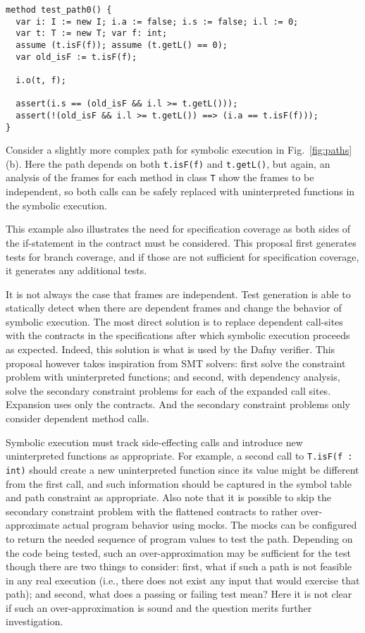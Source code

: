\documentclass[11pt,onecolumn,notitlepage]{article}
\newcommand{\figref}[1]{Fig.~\ref{#1}}
\begin{document}
\begin{lstlisting}
method test_path0() {
  var i: I := new I; i.a := false; i.s := false; i.l := 0;
  var t: T := new T; var f: int;
  assume (t.isF(f)); assume (t.getL() == 0);
  var old_isF := t.isF(f);
  
  i.o(t, f);
  
  assert(i.s == (old_isF && i.l >= t.getL()));
  assert(!(old_isF && i.l >= t.getL()) ==> (i.a == t.isF(f)));
}
\end{lstlisting}


Consider a slightly more complex path for symbolic execution in \figref{fig:paths}(b). Here the path depends on both \texttt{t.isF(f)} and \texttt{t.getL()}, but again, an analysis of the frames for each method in class \texttt{T} show the frames to be independent, so both calls can be safely replaced with uninterpreted functions in the symbolic execution.

This example also illustrates the need for specification coverage as both sides of the if-statement in the contract must be considered. This proposal first generates tests for branch coverage, and if those are not sufficient for specification coverage, it generates any additional tests. 

It is not always the case that frames are independent. Test generation is able to statically detect when there are dependent frames and change the behavior of symbolic execution. The most direct solution is to replace dependent call-sites with the contracts in the specifications after which symbolic execution proceeds as expected. Indeed, this solution is what is used by the Dafny verifier. This proposal however takes inspiration from SMT solvers: first solve the constraint problem with uninterpreted functions; and second, with dependency analysis, solve the secondary constraint problems for each of the expanded call sites. Expansion uses only the contracts. And the secondary constraint problems only consider dependent method calls.

Symbolic execution must track side-effecting calls and introduce new uninterpreted functions as appropriate. For example, a second call to \texttt{T.isF(f : int)} should create a new uninterpreted function since its value might be different from the first call, and such information should be captured in the symbol table and path constraint as appropriate. Also note that it is possible to skip the secondary constraint problem with the flattened contracts to rather over-approximate actual program behavior using mocks. The mocks can be configured to return the needed sequence of program values to test the path. Depending on the code being tested, such an over-approximation may be sufficient for the test though there are two things to consider: first, what if such a path is not feasible in any real execution (i.e., there does not exist any input that would exercise that path); and second, what does a passing or failing test mean? Here it is not clear if such an over-approximation is sound and the question merits further investigation.
\end{document}
